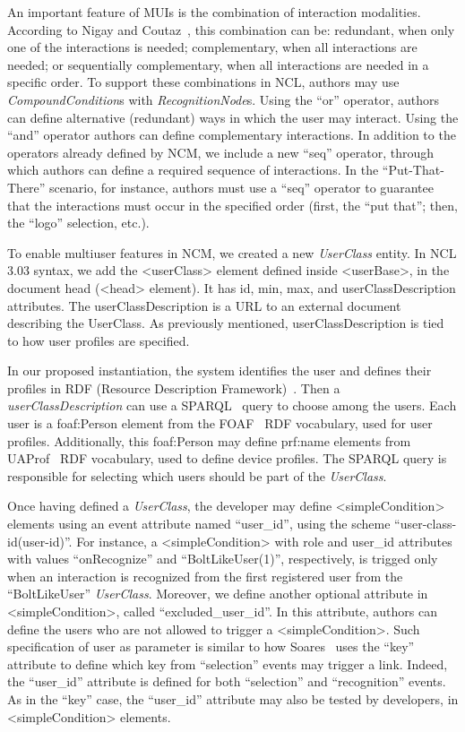 \documentclass[
  doutorado,
  american
]{ThesisPUC}
\begin{document}
An important feature of MUIs is the combination of interaction modalities.
According to Nigay and Coutaz~\cite{coutaz_four_1995}, this combination can be:
redundant, when only one of the interactions is needed; complementary, when all
interactions are needed; or sequentially complementary, when all interactions
are needed in a specific order. To support these combinations in NCL, authors
may use \textit{CompoundCondition}s with \textit{RecognitionNode}s. Using the
“or” operator, authors can define alternative (redundant) ways in which the user
may interact. Using the “and” operator authors can define complementary
interactions. In addition to the operators already defined by NCM, we include a
new “seq” operator, through which authors can define a required sequence of
interactions. In the “Put-That-There” scenario, for instance, authors must use a
“seq” operator to guarantee that the interactions must occur in the specified
order (first, the “put that”; then, the “logo” selection, etc.).

To enable multiuser features in NCM, we created a new \textit{UserClass} entity.
In NCL 3.03 syntax, we add the <userClass> element defined inside <userBase>, in
the document head (<head> element). It has id, min, max, and
userClassDescription attributes. The userClassDescription is a URL to an
external document describing the UserClass. As previously mentioned,
userClassDescription is tied to how user profiles are specified. 

In our proposed instantiation, the system identifies the user and defines their
profiles in RDF (Resource Description Framework)~\cite{w3c_rdf/xml_2014}. Then a \textit{userClassDescription} can use a SPARQL~\cite{w3c_sparql_2008} query to
choose among the users. Each user is a foaf:Person element from the
FOAF~\cite{brickley_foaf_2014} RDF vocabulary, used for user profiles.
Additionally, this foaf:Person may define prf:name elements from
UAProf~\cite{openmobilealliance_wag_2001} RDF vocabulary, used to define device
profiles. The SPARQL query is responsible for selecting which users should be
part of the \textit{UserClass}.

Once having defined a \textit{UserClass}, the developer may define
<simpleCondition> elements using an event attribute named “user\_id”, using the
scheme “user-class-id(user-id)”. For instance, a <simpleCondition> with role and
user\_id attributes with values “onRecognize” and “BoltLikeUser(1)”,
respectively, is trigged only when an interaction is recognized from the first
registered user from the “BoltLikeUser” \textit{UserClass}. Moreover, we define
another optional attribute in <simpleCondition>, called “excluded\_user\_id”. In
this attribute, authors can define the users who are not allowed to trigger a
<simpleCondition>. Such specification of user as parameter is similar to how
Soares~\cite{soares_nested_2009} uses the “key” attribute to define which key
from “selection” events may trigger a link. Indeed, the “user\_id” attribute is
defined for both “selection” and “recognition” events. As in the “key” case, the
“user\_id” attribute may also be tested by developers, in <simpleCondition>
elements. 
\end{document}
